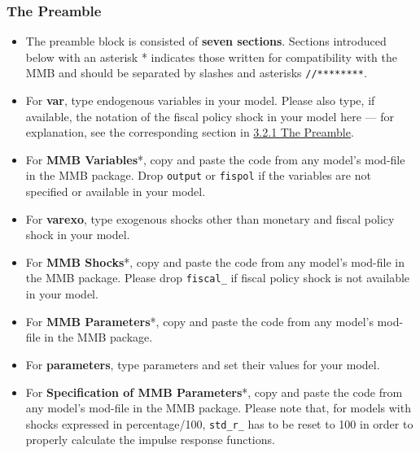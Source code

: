 \documentclass[10pt,a4paper]{article}
\begin{document}
\subsubsection{The Preamble}
\medskip
\begin{itemize}
\item The preamble block is consisted of \textbf{seven sections}. Sections introduced below with an asterisk * indicates those written for compatibility with the MMB and should be separated by slashes and asterisks \texttt{//********}.

\item For \textbf{var}, type endogenous variables in your model. Please also type, if available, the notation of the fiscal policy shock in your model here — for explanation, see the corresponding section in \hyperref[sec:Preamble]{3.2.1 The Preamble}.

\item For \textbf{MMB Variables}*, copy and paste the code from any model’s mod-file in the MMB package.  Drop \texttt{output} or \texttt{fispol} if the variables are not specified or available in your model.

\item For \textbf{varexo}, type exogenous shocks other than monetary and fiscal policy shock in your model.

\item For \textbf{MMB Shocks}*, copy and paste the code from any model’s mod-file in the MMB package. Please drop \texttt{fiscal\_} if fiscal policy shock is not available in your model.

\item For \textbf{MMB Parameters}*, copy and paste the code from any model’s mod-file in the MMB package.

\item For \textbf{parameters}, type parameters and set their values for your model.

\item For \textbf{Specification of MMB Parameters}*, copy and paste the code from any model’s mod-file in the MMB package. Please note that, for models with shocks expressed in percentage/100, \texttt{std\_r\_} has to be reset to 100 in order to properly calculate the impulse response functions.
\end{itemize}
\end{document}
